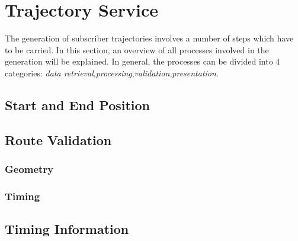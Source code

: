 \documentclass[master,english]{hgbthesis}
\begin{document}
\section{Trajectory Service}
The generation of subscriber trajectories involves a number of steps which have to be carried. In this section, an overview of all processes involved in the generation will be explained. In general, the processes can be divided into 4 categories: \emph{data retrieval},\emph{processing},\emph{validation},\emph{presentation}.
\subsection{Start and End Position}
\subsection{Route Validation}
\subsubsection{Geometry}
\subsubsection{Timing}
\subsection{Timing Information}
\end{document}
